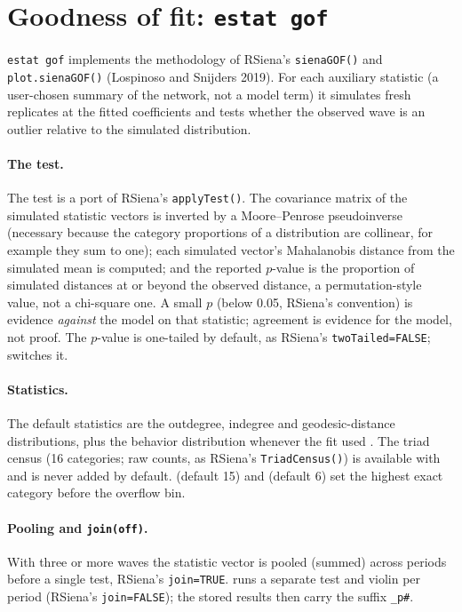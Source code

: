 \section{Goodness of fit: \texttt{estat gof}}
\texttt{estat gof} implements the methodology of RSiena's \texttt{sienaGOF()} and \texttt{plot.sienaGOF()} (Lospinoso and Snijders 2019). For each auxiliary statistic (a user-chosen summary of the network, not a model term) it simulates  fresh replicates at the fitted coefficients and tests whether the observed wave is an outlier relative to the simulated distribution.

\paragraph{The test.} The test is a port of RSiena's \texttt{applyTest()}. The covariance matrix of the simulated statistic vectors is inverted by a Moore--Penrose pseudoinverse (necessary because the category proportions of a distribution are collinear, for example they sum to one); each simulated vector's Mahalanobis distance from the simulated mean is computed; and the reported $p$-value is the proportion of simulated distances at or beyond the observed distance, a permutation-style value, not a chi-square one. A small $p$ (below 0.05, RSiena's convention) is evidence \emph{against} the model on that statistic; agreement is evidence for the model, not proof. The $p$-value is one-tailed by default, as RSiena's \texttt{twoTailed=FALSE};  switches it.

\paragraph{Statistics.} The default statistics are the outdegree, indegree and geodesic-distance distributions, plus the behavior distribution whenever the fit used . The triad census (16 categories; raw counts, as RSiena's \texttt{TriadCensus()}) is available with  and is never added by default.  (default 15) and  (default 6) set the highest exact category before the overflow bin.

\paragraph{Pooling and \texttt{join(off)}.} With three or more waves the statistic vector is pooled (summed) across periods before a single test, RSiena's \texttt{join=TRUE}.  runs a separate test and violin per period (RSiena's \texttt{join=FALSE}); the stored results then carry the suffix \texttt{\_p\#}.

